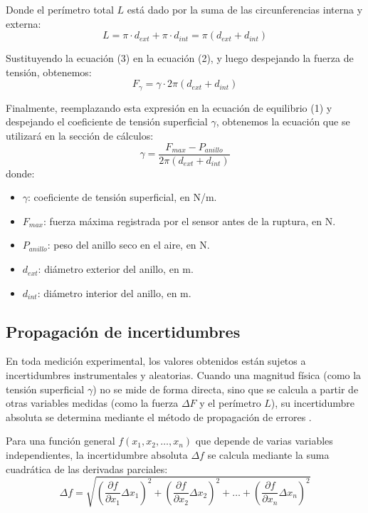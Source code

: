 \documentclass[11pt,a4paper]{article}
\begin{document}
Donde el perímetro total \(L\) está dado por la suma de las circunferencias interna y externa:
\begin{equation*}
    L = \pi \cdot d_{ext} + \pi \cdot d_{int} = \pi(d_{ext} + d_{int})
\end{equation*}

Sustituyendo la ecuación (3) en la ecuación (2), y luego despejando la fuerza de tensión, obtenemos:
\begin{equation*}
    F_\gamma = \gamma \cdot 2\pi(d_{ext} + d_{int})
\end{equation*}

Finalmente, reemplazando esta expresión en la ecuación de equilibrio (1) y despejando el coeficiente de tensión superficial \(\gamma\), obtenemos la ecuación que se utilizará en la sección de cálculos:
\begin{equation} \label{eq:tension_superficial}
    \gamma = \frac{F_{max} - P_{anillo}}{2\pi(d_{ext} + d_{int})}
\end{equation}
donde:
\begin{itemize}
    \item \(\gamma\): coeficiente de tensión superficial, en N/m.
    \item \(F_{max}\): fuerza máxima registrada por el sensor antes de la ruptura, en N.
    \item \(P_{anillo}\): peso del anillo seco en el aire, en N.
    \item \(d_{ext}\): diámetro exterior del anillo, en m.
    \item \(d_{int}\): diámetro interior del anillo, en m.
\end{itemize}

\subsection{Propagación de incertidumbres}

En toda medición experimental, los valores obtenidos están sujetos a incertidumbres instrumentales y aleatorias. Cuando una magnitud física (como la tensión superficial \(\gamma\)) no se mide de forma directa, sino que se calcula a partir de otras variables medidas (como la fuerza \(\Delta F\) y el perímetro \(L\)), su incertidumbre absoluta se determina mediante el método de propagación de errores \cite{guia}.

Para una función general \(f(x_1, x_2, \dots, x_n)\) que depende de varias variables independientes, la incertidumbre absoluta \(\Delta f\) se calcula mediante la suma cuadrática de las derivadas parciales:
\begin{equation*}
    \Delta f = \sqrt{\left(\frac{\partial f}{\partial x_1}\Delta x_1\right)^2 + \left(\frac{\partial f}{\partial x_2}\Delta x_2\right)^2 + \dots + \left(\frac{\partial f}{\partial x_n}\Delta x_n\right)^2}
\end{equation*}
\end{document}
